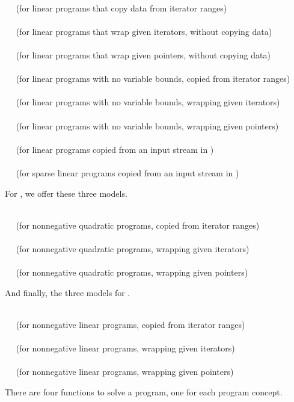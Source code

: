 \\
$\quad$ (for linear programs that copy data from iterator ranges) \\
\\
$\quad$ (for linear programs that wrap given iterators, without copying 
data) \\
\\
$\quad$ (for linear programs that wrap given pointers, without copying 
data) \\
\\
$\quad$ (for linear programs with no variable bounds, copied from iterator ranges)\\
\\
$\quad$ (for linear programs with no variable bounds, wrapping given 
iterators)\\
\\
$\quad$ (for linear programs with no variable bounds, wrapping given 
pointers)\\
\\ 
$\quad$ (for linear programs copied from an input stream in 
)\\
\\
$\quad$ (for sparse linear programs copied from an input stream in 
)

For , we offer these
three models.

\\
$\quad$ (for nonnegative quadratic programs, copied from iterator ranges)\\
\\
$\quad$ (for nonnegative quadratic programs, wrapping given iterators)\\
\\
$\quad$ (for nonnegative quadratic programs, wrapping given pointers)

And finally, the three models for .

\\
$\quad$ (for nonnegative linear programs, copied from iterator ranges)\\
\\
$\quad$ (for nonnegative linear programs, wrapping given iterators)\\
\\
$\quad$ (for nonnegative linear programs, wrapping given pointers)\\

There are four functions to solve a program, one for each program
concept. 
